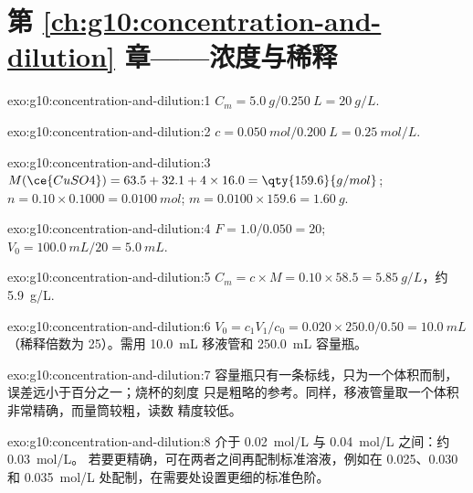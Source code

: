 \section*{第 \ref{ch:g10:concentration-and-dilution} 章——浓度与稀释}

\begin{solution}{exo:g10:concentration-and-dilution:1}
$C_m = \qty{5.0}{g} / \qty{0.250}{L} = \qty{20}{g/L}$.
\end{solution}

\begin{solution}{exo:g10:concentration-and-dilution:2}
$c = \qty{0.050}{mol} / \qty{0.200}{L} = \qty{0.25}{mol/L}$.
\end{solution}

\begin{solution}{exo:g10:concentration-and-dilution:3}
$M(\ce{CuSO4}) = 63.5 + 32.1 + 4 \times 16.0 = \qty{159.6}{g/mol}$;
$n = 0.10 \times 0.1000 = \qty{0.0100}{mol}$; $m = 0.0100 \times 159.6 =
\qty{1.60}{g}$.
\end{solution}

\begin{solution}{exo:g10:concentration-and-dilution:4}
$F = 1.0 / 0.050 = 20$; $V_0 = \qty{100.0}{mL} / 20 = \qty{5.0}{mL}$.
\end{solution}

\begin{solution}{exo:g10:concentration-and-dilution:5}
$C_m = c \times M = 0.10 \times 58.5 = \qty{5.85}{g/L}$，约
\qty{5.9}{g/L}.
\end{solution}

\begin{solution}{exo:g10:concentration-and-dilution:6}
$V_0 = c_1 V_1 / c_0 = 0.020 \times 250.0 / 0.50 = \qty{10.0}{mL}$
（稀释倍数为 25）。需用 \qty{10.0}{mL} 移液管和
\qty{250.0}{mL} 容量瓶。
\end{solution}

\begin{solution}{exo:g10:concentration-and-dilution:7}
容量瓶只有一条标线，只为一个体积而制，
误差远小于百分之一；烧杯的刻度
只是粗略的参考。同样，移液管量取一个体积
非常精确，而量筒较粗，读数
精度较低。
\end{solution}

\begin{solution}{exo:g10:concentration-and-dilution:8}
介于 \qty{0.02}{mol/L} 与 \qty{0.04}{mol/L} 之间：约 \qty{0.03}{mol/L}。
若要更精确，可在两者之间再配制标准溶液，例如在
0.025、0.030 和 \qty{0.035}{mol/L} 处配制，在需要处设置更细的标准色阶。
\end{solution}

